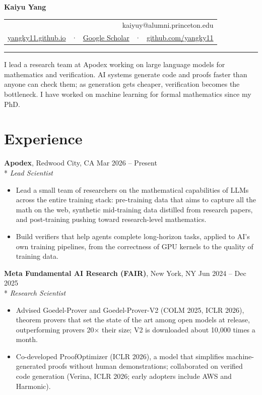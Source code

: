 \documentclass[10pt]{article}
\newcommand{\entry}[4]{%
  \textbf{#1}, #2 \hfill #4\\*
  \textit{#3}\par}
\begin{document}
{\LARGE\bfseries Kaiyu Yang}\hfill
\begin{tabular}[b]{r@{}}
  \small kaiyuy@alumni.princeton.edu\\[-1pt]
  \small \href{https://yangky11.github.io}{yangky11.github.io} \, · \,
  \href{https://scholar.google.com/citations?user=FciCu4EAAAAJ}{Google Scholar} \, · \,
  \href{https://github.com/yangky11}{github.com/yangky11}
\end{tabular}

\vspace{0.3em}
{\color{accent!40}\rule{\textwidth}{0.8pt}}
\vspace{0.3em}

I lead a research team at Apodex working on large language models for mathematics and
verification. AI systems generate code and proofs faster than anyone can check them; as
generation gets cheaper, verification becomes the bottleneck. I have worked on machine
learning for formal mathematics since my PhD.

\section{Experience}

\entry{Apodex}{Redwood City, CA}{Lead Scientist}{Mar 2026 -- Present}
\begin{itemize}
  \item Lead a small team of researchers on the mathematical capabilities of LLMs across
        the entire training stack: pre-training data that aims to capture all the math on the web,
        synthetic mid-training data distilled from research papers, and post-training
        pushing toward research-level mathematics.
  \item Build verifiers that help agents complete long-horizon tasks, applied to AI's own
        training pipelines, from the correctness of GPU kernels to the quality of training data.
\end{itemize}

\vspace{0.25em}
\entry{Meta Fundamental AI Research (FAIR)}{New York, NY}{Research Scientist}{Jun 2024 -- Dec 2025}
\begin{itemize}
  \item Advised Goedel-Prover and Goedel-Prover-V2 (COLM 2025, ICLR 2026), theorem provers
        that set the state of the art among open models at release, outperforming provers
        20$\times$ their size; V2 is downloaded about 10,000 times a month.
  \item Co-developed ProofOptimizer (ICLR 2026), a model that simplifies machine-generated
        proofs without human demonstrations; collaborated on verified code generation
        (Verina, ICLR 2026; early adopters include AWS and Harmonic).
\end{itemize}
\end{document}
